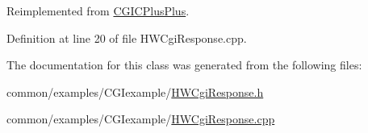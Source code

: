 \-Reimplemented from \hyperlink{class_c_g_i_c_plus_plus_a2f2776ae8909abdf3769c84415d64952}{\-C\-G\-I\-C\-Plus\-Plus}.



\-Definition at line 20 of file \-H\-W\-Cgi\-Response.\-cpp.



\-The documentation for this class was generated from the following files\-:\begin{DoxyCompactItemize}
\item 
common/examples/\-C\-G\-Iexample/\hyperlink{_h_w_cgi_response_8h}{\-H\-W\-Cgi\-Response.\-h}\item 
common/examples/\-C\-G\-Iexample/\hyperlink{_h_w_cgi_response_8cpp}{\-H\-W\-Cgi\-Response.\-cpp}\end{DoxyCompactItemize}
